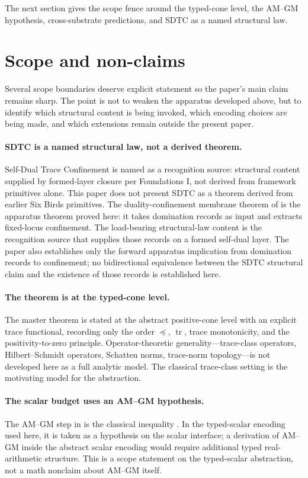 \documentclass[11pt]{article}
\DeclareMathOperator{\trace}{tr}
\theoremstyle{definition}
\begin{document}
The next section gives the scope fence around the typed-cone level,
the AM--GM hypothesis, cross-substrate predictions, and SDTC as a
named structural law.
 

\section{Scope and non-claims}
\label{sec:scope}

Several scope boundaries deserve explicit statement so the paper's
main claim remains sharp.  The point is not to weaken the apparatus
developed above, but to identify which structural content is being
invoked, which encoding choices are being made, and which
extensions remain outside the present paper.

\paragraph{SDTC is a named structural law, not a derived theorem.}
Self-Dual Trace Confinement is named as a recognition source:
structural content supplied by formed-layer closure per Foundations
I, not derived from framework primitives alone.  This paper does
not present SDTC as a theorem derived from earlier Six Birds
primitives.  The duality-confinement membrane theorem of
 is the apparatus theorem proved here: it
takes domination records as input and extracts fixed-locus
confinement.  The load-bearing structural-law content is the
recognition source that supplies those records on a formed
self-dual layer.  The paper also establishes only the forward
apparatus implication from domination records to confinement; no
bidirectional equivalence between the SDTC structural claim and
the existence of those records is established here.

\paragraph{The theorem is at the typed-cone level.}
The master theorem is stated at the abstract positive-cone level with
an explicit trace functional, recording only the order \(\preceq\),
\(\trace\), trace monotonicity, and the positivity-to-zero principle.
Operator-theoretic generality---trace-class operators,
Hilbert--Schmidt operators, Schatten norms, trace-norm topology---is
not developed here as a full analytic model.  The classical
trace-class setting is the motivating model for the abstraction.

\paragraph{The scalar budget uses an AM--GM hypothesis.}
The AM--GM step in
 is the
classical inequality \citep{HardyLittlewoodPolya1952}.  In the
typed-scalar encoding used here, it is taken as a hypothesis on the
scalar interface; a derivation of AM--GM inside the abstract scalar
encoding would require additional typed real-arithmetic structure.
This is a scope statement on the typed-scalar abstraction, not a math
nonclaim about AM--GM itself.
\end{document}
